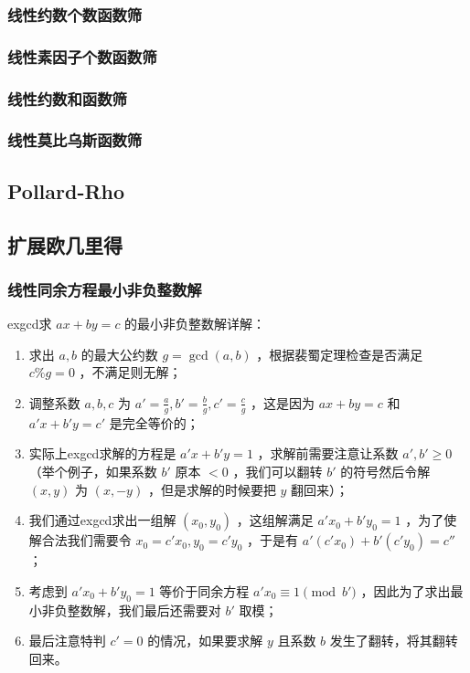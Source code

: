 \documentclass{article}
\begin{document}
\subsubsection{线性约数个数函数筛}

\subsubsection{线性素因子个数函数筛}

\subsubsection{线性约数和函数筛}

\subsubsection{线性莫比乌斯函数筛}

\subsection{Pollard-Rho}

\subsection{扩展欧几里得}
\subsubsection{线性同余方程最小非负整数解}
exgcd求 $ax+by=c$ 的最小非负整数解详解：
\begin{enumerate}
    \item 求出 $a,b$ 的最大公约数 $g=\gcd(a,b)$ ，根据裴蜀定理检查是否满足 $c\% g=0$ ，不满足则无解；
    \item 调整系数 $a,b,c$ 为 $a'=\frac{a}{g},b'=\frac{b}{g},c'=\frac{c}{g}$ ，这是因为 $ax+by=c$ 和 $a'x+b'y=c'$ 是完全等价的；
    \item 实际上exgcd求解的方程是 $a'x+b'y=1$ ，求解前需要注意让系数 $a',b'\geq 0$ （举个例子，如果系数 $b'$ 原本 $<0$ ，我们可以翻转 $b'$ 的符号然后令解 $(x,y)$ 为 $(x,-y)$ ，但是求解的时候要把 $y$ 翻回来）；
    \item 我们通过exgcd求出一组解 $(x_0,y_0)$ ，这组解满足 $a'x_0+b'y_0=1$ ，为了使解合法我们需要令 $x_0=c'x_0,y_0=c'y_0$ ，于是有 $a'(c'x_0)+b'(c'y_0)=c''$ ；
    \item 考虑到 $a'x_0+b'y_0=1$ 等价于同余方程 $a'x_0\equiv 1\pmod{b'}$ ，因此为了求出最小非负整数解，我们最后还需要对 $b'$ 取模；
    \item 最后注意特判 $c'=0$ 的情况，如果要求解 $y$ 且系数 $b$ 发生了翻转，将其翻转回来。
\end{enumerate}

\end{document}
